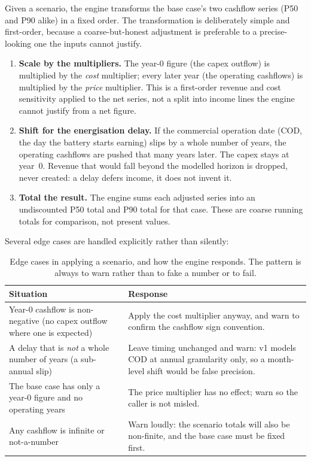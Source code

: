 Given a scenario, the engine transforms the base case's two cashflow series (P50 and P90 alike) in a fixed order. The transformation is deliberately simple and first-order, because a coarse-but-honest adjustment is preferable to a precise-looking one the inputs cannot justify.

\begin{enumerate}
  \item \textbf{Scale by the multipliers.} The year-0 figure (the capex outflow) is multiplied by the \emph{cost} multiplier; every later year (the operating cashflows) is multiplied by the \emph{price} multiplier. This is a first-order revenue and cost sensitivity applied to the net series, not a split into income lines the engine cannot justify from a net figure.
  \item \textbf{Shift for the energisation delay.} If the commercial operation date (COD, the day the battery starts earning) slips by a whole number of years, the operating cashflows are pushed that many years later. The capex stays at year~0. Revenue that would fall beyond the modelled horizon is dropped, never created: a delay defers income, it does not invent it.
  \item \textbf{Total the result.} The engine sums each adjusted series into an undiscounted P50 total and P90 total for that case. These are coarse running totals for comparison, not present values.
\end{enumerate}

Several edge cases are handled explicitly rather than silently:

\begin{table}[H]
\centering
\caption{Edge cases in applying a scenario, and how the engine responds. The pattern is always to warn rather than to fake a number or to fail.}
\label{tab:scenarioedge}
\small\sffamily
\begin{tabularx}{\textwidth}{@{}L L@{}}
\toprule
\textbf{Situation} & \textbf{Response} \\
\midrule
Year-0 cashflow is non-negative (no capex outflow where one is expected) & Apply the cost multiplier anyway, and warn to confirm the cashflow sign convention. \\
A delay that is \emph{not} a whole number of years (a sub-annual slip) & Leave timing unchanged and warn: v1 models COD at annual granularity only, so a month-level shift would be false precision. \\
The base case has only a year-0 figure and no operating years & The price multiplier has no effect; warn so the caller is not misled. \\
Any cashflow is infinite or not-a-number & Warn loudly: the scenario totals will also be non-finite, and the base case must be fixed first. \\
\bottomrule
\end{tabularx}
\end{table}

